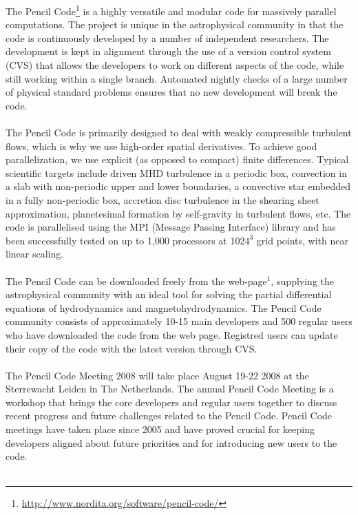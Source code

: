 \documentclass{article}
\begin{document}
The Pencil
Code\footnote{\url{http://www.nordita.org/software/pencil-code/}} is a
highly versatile and modular code for massively parallel computations. The
project is unique in the astrophysical community in that the code is
continuously developed by a number of independent researchers. The development
is kept in alignment through the use of a version control system (CVS) that
allows the developers to work on different aspects of the code, while still
working within a single branch. Automated nightly checks of a large number of
physical standard problems ensures that no new development will break the
code.
\\ \\
The Pencil Code is primarily designed to deal with weakly compressible
turbulent flows, which is why we use high-order spatial derivatives.  To
achieve good parallelization, we use explicit (as opposed to compact) finite
differences. Typical scientific targets include driven MHD turbulence in a
periodic box, convection in a slab with non-periodic upper and lower
boundaries, a convective star embedded in a fully non-periodic box, accretion
disc turbulence in the shearing sheet approximation, planetesimal formation by
self-gravity in turbulent flows, etc. The code is parallelised using the MPI
(Message Passing Interface) library and has been successfully tested on up to
1,000 processors at $1024^3$ grid points, with near linear scaling.
\\ \\
The Pencil Code can be downloaded freely from the web-page$^1$, supplying the
astrophysical community with an ideal tool for solving the partial differential
equations of hydrodynamics and magnetohydrodynamics. The Pencil Code community
consists of approximately 10-15 main developers and 500 regular users who have
downloaded the code from the web page. Registred users can update their
copy of the code with the latest version through CVS.
\\ \\
The Pencil Code Meeting 2008 will take place August 19-22 2008 at the
Sterrewacht Leiden in The Netherlands. The annual Pencil Code Meeting is a workshop
that brings the core developers and regular users together to discuss recent
progress and future challenges related to the Pencil Code. Pencil
Code meetings have taken place since 2005 and have proved crucial for keeping
developers aligned about future priorities and for introducing new users to the
code.
\\ \\
\end{document}
